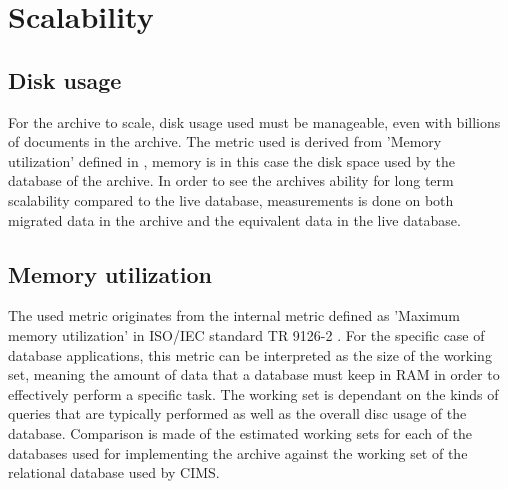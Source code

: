 %

\section{Scalability}

\subsection{Disk usage}
For the archive to scale, disk usage used must be manageable, even with billions of documents in the archive. The metric used is derived from 'Memory utilization' defined in \cite{isoInternalMetric}, memory is in this case the disk space used by the database of the archive. In order to see the archives ability for long term scalability compared to the live database, measurements is done on both migrated data in the archive and the equivalent data in the live database.               

\subsection{Memory utilization}
The used metric originates from the internal metric defined as 'Maximum memory utilization' in ISO/IEC standard TR 9126-2 \cite{isoExternalMetric}. For the specific case of database applications, this metric can be interpreted as the size of the working set, meaning the amount of data that a database must keep in RAM in order to effectively perform a specific task. The working set is dependant on the kinds of queries that are typically performed as well as the overall disc usage of the database. Comparison is made of the estimated working sets for each of the databases used for implementing the archive against the working set of the relational database used by CIMS.

